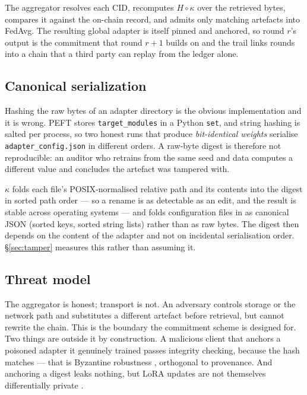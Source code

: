 \documentclass[11pt]{article}
\begin{document}
The aggregator resolves each CID, recomputes $H\circ\kappa$ over the retrieved bytes, compares it against the on-chain record, and admits only matching artefacts into FedAvg. The resulting global adapter is itself pinned and anchored, so round $r$'s output is the commitment that round $r{+}1$ builds on and the trail links rounds into a chain that a third party can replay from the ledger alone.

\subsection{Canonical serialization}
\label{sec:canon}

Hashing the raw bytes of an adapter directory is the obvious implementation and it is wrong. PEFT stores \texttt{target\_modules} in a Python \texttt{set}, and string hashing is salted per process, so two honest runs that produce \emph{bit-identical weights} serialise \texttt{adapter\_config.json} in different orders. A raw-byte digest is therefore not reproducible: an auditor who retrains from the same seed and data computes a different value and concludes the artefact was tampered with.

$\kappa$ folds each file's POSIX-normalised relative path and its contents into the digest in sorted path order --- so a rename is as detectable as an edit, and the result is stable across operating systems --- and folds configuration files in as canonical JSON (sorted keys, sorted string lists) rather than as raw bytes. The digest then depends on the content of the adapter and not on incidental serialisation order. \S\ref{sec:tamper} measures this rather than assuming it.

\subsection{Threat model}

The aggregator is honest; transport is not. An adversary controls storage or the network path and substitutes a different artefact before retrieval, but cannot rewrite the chain. This is the boundary the commitment scheme is designed for. Two things are outside it by construction. A malicious client that anchors a poisoned adapter it genuinely trained passes integrity checking, because the hash matches --- that is Byzantine robustness \cite{blanchard2017krum}, orthogonal to provenance. And anchoring a digest leaks nothing, but LoRA updates are not themselves differentially private \cite{mcmahan2018learning}.
\end{document}

